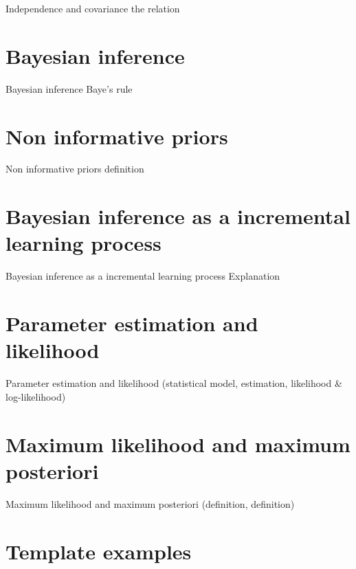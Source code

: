 \documentclass{beamer}
\begin{document}
\begin{frame}{Independence and covariance}
  the relation
\end{frame}

\section{Bayesian inference}

\begin{frame}{Bayesian inference}
  Baye's rule
\end{frame}

\section{Non informative priors}

\begin{frame}{Non informative priors}
  definition
\end{frame}

\section{Bayesian inference as a incremental learning process}

\begin{frame}{Bayesian inference as a incremental learning process}
  Explanation
\end{frame}

\section{Parameter estimation and likelihood}

\begin{frame}{Parameter estimation and likelihood}
  (statistical model, estimation, likelihood \& log-likelihood)
\end{frame}

\section{Maximum likelihood and maximum posteriori}

\begin{frame}{Maximum likelihood and maximum posteriori}
  (definition, definition)
\end{frame}

\section{Template examples}
\end{document}
